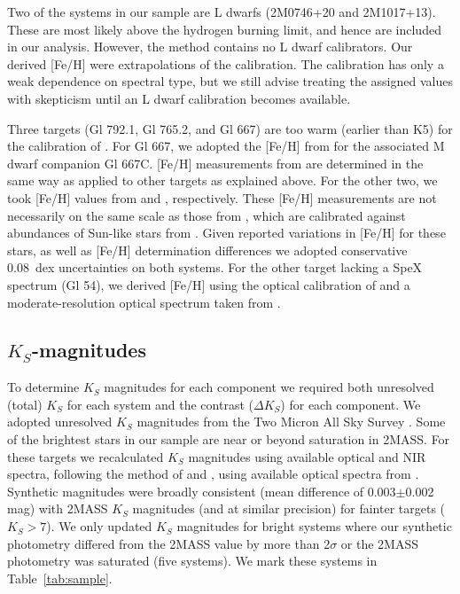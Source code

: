 \documentclass[twocolumn]{aastex62}
\begin{document}
Two of the systems in our sample are L dwarfs (2M0746+20 and 2M1017+13). These are most likely above the hydrogen burning limit, and hence are included in our analysis. However, the \citet{Mann2014} method contains no L dwarf calibrators. Our derived [Fe/H] were extrapolations of the \citet{Mann2014} calibration. The \citet{Mann2014} calibration has only a weak dependence on spectral type, but we still advise treating the assigned values with skepticism until an L dwarf calibration becomes available. 

Three targets (Gl 792.1, Gl 765.2, and Gl 667) are too warm (earlier than K5) for the calibration of \citet{Mann2013a}. For Gl 667, we adopted the [Fe/H] from \citet{2014ApJ...791...54G} for the associated M dwarf companion Gl 667C. [Fe/H] measurements from \citet{2014ApJ...791...54G} are determined in the same way as applied to other targets as explained above. For the other two, we took [Fe/H] values from \citet{2011A&A...530A.138C} and \citet{2010A&ARv..18...67T}, respectively. These [Fe/H] measurements are not necessarily on the same scale as those from \citet{Mann2013a}, which are calibrated against abundances of Sun-like stars from \citet{2015ApJ...805..126B,2016ApJS..225...32B}. Given reported variations in [Fe/H] for these stars, as well as [Fe/H] determination differences \citep{2014AJ....148...54H,2016ApJS..226....4H} we adopted conservative 0.08~dex uncertainties on both systems. For the other target lacking a SpeX spectrum (Gl 54), we derived [Fe/H] using the optical calibration of \citet{Mann2013a} and a moderate-resolution optical spectrum taken from \citet{Gaidos2014}.

\subsection{$K_S$-magnitudes}\label{sec:mags}

To determine $K_S$ magnitudes for each component we required both unresolved (total) $K_S$ for each system and the contrast ($\Delta K_S$) for each component. We adopted unresolved $K_S$ magnitudes from the Two Micron All Sky Survey \citep[2MASS,][]{Skrutskie2006}. Some of the brightest stars in our sample are near or beyond saturation in 2MASS. For these targets we recalculated $K_S$ magnitudes using available optical and NIR spectra, following the method of \citet{Mann2015a} and \citet{Mann2015b}, using available optical spectra from \citet{Gaidos2014}. Synthetic magnitudes were broadly consistent (mean difference of 0.003$\pm$0.002\,mag) with 2MASS $K_S$ magnitudes (and at similar precision) for fainter targets ($K_S>7$). We only updated $K_S$ magnitudes for bright systems where our synthetic photometry differed from the 2MASS value by more than 2$\sigma$ or the 2MASS photometry was saturated (five systems). We mark these systems in Table~\ref{tab:sample}. 
\end{document}
